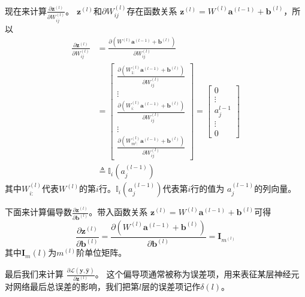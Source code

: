 现在来计算$\frac{\partial \mathbf{z}^{(l)}}{\partial W_{i j}^{(l)}}$。
$\mathbf{z}^{(l)}$和$\partial W_{i j}^{(l)}$存在函数关系 $\mathbf{z}^{(l)}=W^{(l)} \mathbf{a}^{(l-1)}+\mathbf{b}^{(l)}$，所以
\begin{equation}
	\begin{aligned} 
\frac{\partial \mathbf{z}^{(l)}}{\partial W_{i j}^{(l)}}&=\frac{\partial\left(W^{(l)} \mathbf{a}^{(l-1)}+\mathbf{b}^{(l)}\right)}{\partial W_{i j}^{(l)}}\\
&=\left[ \begin{array}{c}{\frac{\partial\left(W_{1 :}^{(l)} \mathbf{a}^{(l-1)}+\mathbf{b}^{(l)}\right)}{\partial W_{i j}^{(l)}}} \\
 {\vdots} \\ 
{\frac{\partial\left(W_{i :}^{(l)} \mathbf{a}^{(l-1)}+\mathbf{b}^{(l)}\right)}{\partial W_{i j}^{(l)}}} 
\\{\vdots}\\ 
{\frac{\partial\left(W_{m^{l}:}^{(l)} \mathbf{a}^{(l-1)}+\mathbf{b}^{(l)}\right)}
{\partial W_{i j}^{(l)}}}\end{array}\right]=\left[ \begin{array}{c}0\\{\vdots}\\a_j^{l-1}\\{\vdots}\\0\end{array}\right]\\
	&\triangleq \mathbb{I}_{i}\left(a_{j}^{(l-1)}\right)
\end{aligned}
\end{equation}
其中$W_{i :}^{(l)}$代表$W^{(l)}$的第$i$行。$\mathbb{I}_{i}\left(a_{j}^{(l-1)}\right)$代表第$i$行的值为
$a_{j}^{(l-1)}$的列向量。

下面来计算偏导数$\frac{\partial \mathbf{z}^{(l)}}{\partial \mathbf{b}^{(l)}}$。带入函数关系
$\mathbf{z}^{(l)}=W^{(l)} \mathbf{a}^{(l-1)}+\mathbf{b}^{(l)}$可得
\begin{equation} 
\frac{\partial \mathbf{z}^{(l)}}{\partial \mathbf{b}^{(l)}}=
\frac{\partial (W^{(l)} \mathbf{a}^{(l-1)}+\mathbf{b}^{(l)})}{\partial \mathbf{b}^{(l)}}
=\mathbf{I}_{m^{(l)}}
 \end{equation}
其中$\mathbf{I}_{m}(l)$为$m^{(l)}$阶单位矩阵。

最后我们来计算 $\frac{\partial \mathcal{L}(\mathbf{y}, \hat{\mathbf{y}})}{\partial \mathbf{z}^{(l)}}$。
这个偏导项通常被称为误差项，用来表征某层神经元对网络最后总误差的影响，我们把第$l$层的误差项记作$\delta(l)$。

